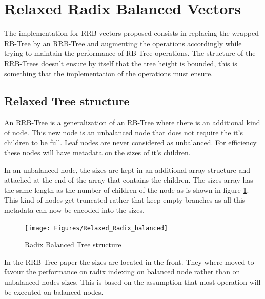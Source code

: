 \clearpage
\section{Relaxed Radix Balanced Vectors}
\label{RelaxedRadixBalancedVectors}

The implementation for RRB vectors proposed consists in replacing the wrapped RB-Tree by an RRB-Tree and augmenting the operations accordingly while trying to maintain the performance of RB-Tree operations. The structure of the RRB-Trees doesn't ensure by itself that the tree height is bounded, this is something that the implementation of the operations must ensure. 


\subsection{Relaxed Tree structure}
An RRB-Tree is a generalization of an RB-Tree where there is an additional kind of node. This new node is an unbalanced node that does not require the it's children to be full. Leaf nodes are never considered as unbalanced. For efficiency these nodes will have metadata on the sizes of it's children. 

In an unbalanced node, the sizes are kept in an additional array structure and attached at the end of the array that contains the children. The sizes array has the same length as the number of children of the node as is shown in figure \ref{Relaxed_Radix_balanced}. This kind of nodes get truncated rather that keep empty branches as all this metadata can now be encoded into the sizes.

\begin{figure}[h!]
  \centering
  \texttt{[image: Figures/Relaxed\_Radix\_balanced]}
  \caption{Radix Balanced Tree structure}
  \label{Relaxed_Radix_balanced}
\end{figure}

In the RRB-Tree paper \cite{RRBTrees} the sizes are located in the front. They where moved to favour the performance on radix indexing on balanced node rather than on unbalanced nodes sizes. This is based on the assumption that most operation will be executed on balanced nodes.

